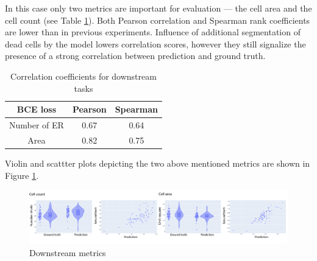 In this case only two metrics are important for evaluation --- the cell area and the cell count (see Table \ref{table:gfp-metrics}). Both Pearson correlation and Spearman rank coefficients are lower than in previous experiments. Influence of additional segmentation of dead cells by the model lowers correlation scores, however they still signalize the presence of a strong correlation between prediction and ground truth. 
\begin{table}[H]
    \centering
    \caption{Correlation coefficients for downstream tasks}
        \begin{adjustbox}{width=0.4\textwidth}
            \begin{tabular}{|c|c|c|}\hline
                BCE loss&Pearson&Spearman
                \\\hline\hline
                Number of ER&0.67&0.64\\\hline
                Area&0.82&0.75\\\hline
            \end{tabular}
            \label{table:gfp-metrics}
        \end{adjustbox}
\end{table}

Violin and scattter plots depicting the two above mentioned metrics are shown in Figure \ref{fig:gfp-bce-metrics}.
\begin{figure}[H]
	\begin{center}
		\includegraphics[width=\linewidth]{bilder/gfp/binary-bce/gfp-bce-metrics.png}
		\caption{Downstream metrics}\label{fig:gfp-bce-metrics}
	\end{center}
\end{figure}